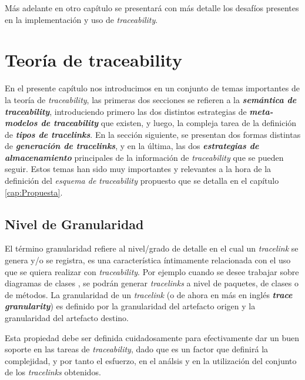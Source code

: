 \documentclass[a4paper,12pt,oneside,spanish]{book}
\begin{document}
Más adelante en otro capítulo se presentará con más detalle los desafíos presentes en la implementación y uso de \textit{traceability}.




\chapter{Teoría de traceability}

En el presente capítulo nos introducimos en un conjunto de temas importantes de la teoría de \textit{traceability}, las primeras dos secciones se refieren a la \textit{\textbf{semántica de traceability}}, introduciendo primero las dos distintos estrategias de \textit{\textbf{meta-modelos de traceability}} que existen, y luego, la compleja tarea de la definición de \textit{\textbf{tipos de tracelinks}}. En la sección siguiente, se presentan dos formas distintas de \textit{\textbf{generación de tracelinks}}, y en la última, las dos \textit{\textbf{estrategias de almacenamiento}} principales de la información de \textit{traceability} que se pueden seguir. Estos temas han sido muy importantes y relevantes a la hora de la definición del \textit{esquema de traceability} propuesto que se detalla en el capítulo \ref{cap:Propuesta}.




\section{Nivel de Granularidad}
El término granularidad refiere al nivel/grado de detalle en el cual un \textit{tracelink} se genera y/o se registra, es una característica íntimamente relacionada con el uso que se quiera realizar con \textit{traceability}. Por ejemplo cuando se desee trabajar sobre diagramas de clases , se podrán generar \textit{tracelinks} a nivel de paquetes, de clases o de métodos. La granularidad de un \textit{tracelink} (o de ahora en más en inglés \textit{\textbf{trace granularity}}) es definido por la granularidad del artefacto origen y la granularidad del artefacto destino.

Esta propiedad debe ser definida cuidadosamente para efectivamente dar un buen soporte en las tareas de \textit{traceability}, dado que es un factor que definirá la complejidad, y por tanto el esfuerzo, en el análsis y en la utilización del conjunto de los \textit{tracelinks} obtenidos.
\end{document}
